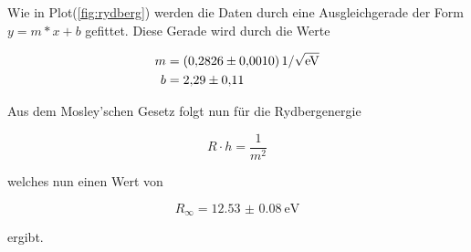           \noindent Wie in Plot(\ref{fig:rydberg}) werden die Daten durch eine Ausgleichgerade der Form $y = m * x + b$ gefittet.
          Diese Gerade wird durch die Werte

          \begin{align*}
            m &= \SI{0.2826 \pm 0.0010}{1\per\sqrt{\electronvolt}}\\
            b &= \num{2.29 \pm 0.11}
          \end{align*}

          \noindent Aus dem Mosley'schen Gesetz folgt nun für die Rydbergenergie 

          \begin{equation*}
            R \cdot h = \frac{1}{m^2}
          \end{equation*}
          
          \noindent welches nun einen Wert von 

          \begin{equation*}
            R_{\infty} = \SI{12.53(8)}{\electronvolt}
          \end{equation*}

          \noindent ergibt.

            
            
            

           

    



        


